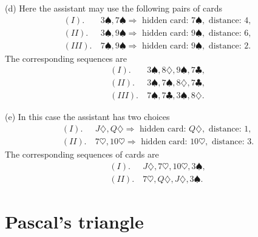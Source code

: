 \begin{enumerate}
(d) Here the assistant may use the following pairs of cards
\begin{align*}
(I). &\ 3\spadesuit,7\spadesuit\Rightarrow\mbox{ hidden card: }7\spadesuit,\mbox{ distance: }4,\\
(II). &\  3\spadesuit,9\spadesuit\Rightarrow\mbox{ hidden card: }9\spadesuit,\mbox{ distance: }6,\\
(III). &\  7\spadesuit,9\spadesuit\Rightarrow\mbox{ hidden card: }9\spadesuit,\mbox{ distance: }2.
\end{align*}
The corresponding sequences are
\begin{align*}
(I). &\ 3\spadesuit,8\diamondsuit,9\spadesuit,7\clubsuit,\\
(II). &\ 3\spadesuit,7\spadesuit,8\diamondsuit,7\clubsuit,\\
(III). &\ 7\spadesuit,7\clubsuit,3\spadesuit,8\diamondsuit.
\end{align*}


(e) In this case the assistant has two choices
\begin{align*}
(I). &\ J\diamondsuit,Q\diamondsuit\Rightarrow\mbox{ hidden card: }Q\diamondsuit,\mbox{ distance: }1,\\
(II). &\ 7\heartsuit,10\heartsuit\Rightarrow\mbox{ hidden card: }10\heartsuit,\mbox{ distance: }3.
\end{align*}
The corresponding sequences of cards are
\begin{align*}
(I). &\ J\diamondsuit,7\heartsuit,10\heartsuit,3\spadesuit,\\
(II). &\ 7\heartsuit,Q\diamondsuit,J\diamondsuit,3\spadesuit.
\end{align*}

\end{enumerate}


\newpage
\section{Pascal's triangle}


